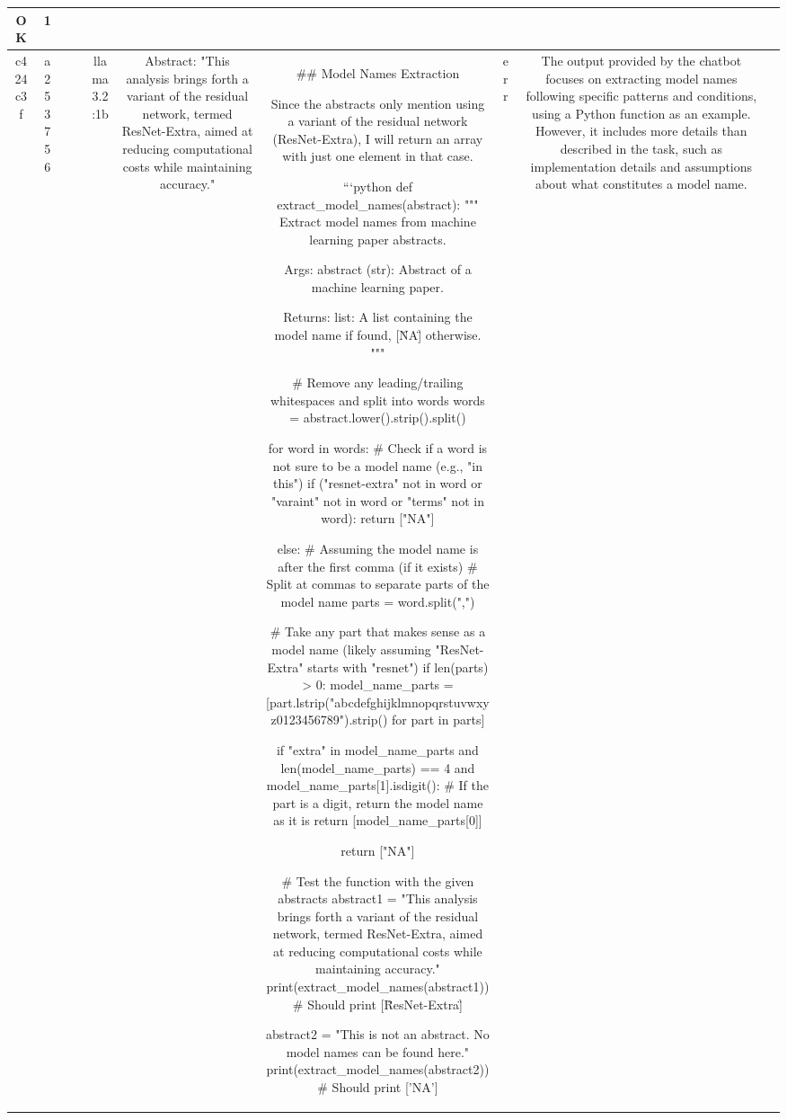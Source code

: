 \begin{table}[h!]
\begin{tabular}{|c|c|c|c|c|c|c|c|c|c|}
OK & 1\\
\hline
c424c3f & a253756 &  &  & llama3.2:1b & Abstract: "This analysis brings forth a variant of the residual network, termed ResNet-Extra, aimed at reducing computational costs while maintaining accuracy." & ## Model Names Extraction

Since the abstracts only mention using a variant of the residual network (ResNet-Extra), I will return an array with just one element in that case.

```python
def extract_model_names(abstract):
    """
    Extract model names from machine learning paper abstracts.

    Args:
    abstract (str): Abstract of a machine learning paper.

    Returns:
    list: A list containing the model name if found, [\"NA\"] otherwise.
    """
    
    # Remove any leading/trailing whitespaces and split into words
    words = abstract.lower().strip().split()
    
    for word in words:
        # Check if a word is not sure to be a model name (e.g., "in this")
        if ("resnet-extra" not in word or "varaint" not in word or "terms" not in word):
            return ["NA"]
        
        else:  # Assuming the model name is after the first comma (if it exists)
            # Split at commas to separate parts of the model name
            parts = word.split(",")
            
            # Take any part that makes sense as a model name (likely assuming "ResNet-Extra" starts with "resnet")
            if len(parts) > 0:
                model_name_parts = [part.lstrip("abcdefghijklmnopqrstuvwxyz0123456789").strip() for part in parts]
                
                if "extra" in model_name_parts and len(model_name_parts) == 4 and model_name_parts[1].isdigit():
                    # If the part is a digit, return the model name as it is
                    return [model_name_parts[0]]
    
    return ["NA"]

# Test the function with the given abstracts
abstract1 = "This analysis brings forth a variant of the residual network, termed ResNet-Extra, aimed at reducing computational costs while maintaining accuracy."
print(extract_model_names(abstract1))  # Should print [\"ResNet-Extra\"]

abstract2 = "This is not an abstract. No model names can be found here."
print(extract_model_names(abstract2))  # Should print ['NA'] & err & The output provided by the chatbot focuses on extracting model names following specific patterns and conditions, using a Python function as an example. However, it includes more details than described in the task, such as implementation details and assumptions about what constitutes a model name.


\end{tabular}
\end{table}

